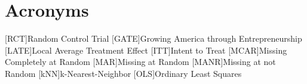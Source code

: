 
\section*{Acronyms}
\begin{acronym}
	[RCT]{Random Control Trial}
	[GATE]{Growing America through Entrepreneurship}
      	[LATE]{Local Average Treatment Effect}
	[ITT]{Intent to Treat}
	[MCAR]{Missing Completely at Random}
	[MAR]{Missing at Random}
	[MANR]{Missing at not Random}
	[kNN]{k-Nearest-Neighbor}
	[OLS]{Ordinary Least Squares}
\end{acronym}
